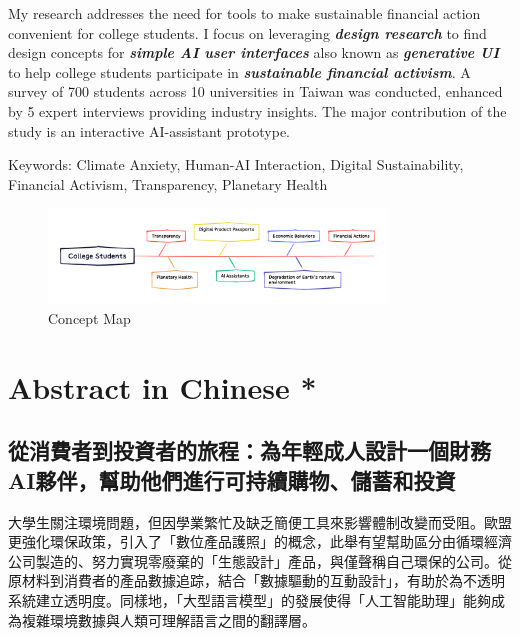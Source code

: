 \documentclass[
  letterpaper,
  DIV=11,
  numbers=noendperiod]{scrartcl}
\begin{document}
My research addresses the need for tools to make sustainable financial
action convenient for college students. I focus on leveraging
\textbf{\emph{design research}} to find design concepts for
\textbf{\emph{simple AI user interfaces}} also known as
\textbf{\emph{generative UI}} to help college students participate in
\textbf{\emph{sustainable financial activism}}. A survey of 700 students
across 10 universities in Taiwan was conducted, enhanced by 5 expert
interviews providing industry insights. The major contribution of the
study is an interactive AI-assistant prototype.

Keywords: Climate Anxiety, Human-AI Interaction, Digital Sustainability,
Financial Activism, Transparency, Planetary Health

\begin{figure}[H]

{\centering \includegraphics[width=0.8\textwidth,height=\textheight]{./images/abstract.png}

}

\caption{Concept Map}

\end{figure}%

\section{Abstract in Chinese *}\label{abstract-in-chinese}

\subsection{從消費者到投資者的旅程：為年輕成人設計一個財務AI夥伴，幫助他們進行可持續購物、儲蓄和投資}\label{ux5f9eux6d88ux8cbbux8005ux5230ux6295ux8cc7ux8005ux7684ux65c5ux7a0bux70baux5e74ux8f15ux6210ux4ebaux8a2dux8a08ux4e00ux500bux8ca1ux52d9aiux5925ux4f34ux5e6bux52a9ux4ed6ux5011ux9032ux884cux53efux6301ux7e8cux8cfcux7269ux5132ux84c4ux548cux6295ux8cc7}

大學生關注環境問題，但因學業繁忙及缺乏簡便工具來影響體制改變而受阻。歐盟更強化環保政策，引入了「數位產品護照」的概念，此舉有望幫助區分由循環經濟公司製造的、努力實現零廢棄的「生態設計」產品，與僅聲稱自己環保的公司。從原材料到消費者的產品數據追踪，結合「數據驅動的互動設計」，有助於為不透明系統建立透明度。同樣地，「大型語言模型」的發展使得「人工智能助理」能夠成為複雜環境數據與人類可理解語言之間的翻譯層。
\end{document}
